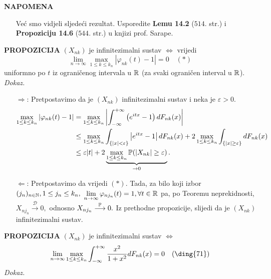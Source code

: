 \documentclass{article}
\begin{document}
\textbf{NAPOMENA}
\begin{enumerate}
    \item[\ding{113}] Već smo vidjeli sljedeći rezultat. Usporedite \textbf{Lemu 14.2} (\(514.\) str.) i  \textbf{Propoziciju 14.6} (\(544.\) str.) u knjizi prof. Sarape. 
\end{enumerate}
\textbf{PROPOZICIJA}\newline
\((X_{nk})\) je infinitezimalni sustav \(\Leftrightarrow\) vrijedi \[\lim_{n\to\infty}\max_{1\le k\le k_n}|\varphi_{nk}(t)-1|=0\quad(\ast)\] uniformno po \(t\) iz ograničenog intervala u \(\Bbb R\) (za svaki ograničen interval u \(\Bbb R\)).\newline\newline
\textit{Dokaz.}
\begin{enumerate}
    \item[\(\boxed{\Rightarrow}\):] Pretpostavimo da je \((X_{nk})\) infinitezimalni sustav i neka je \(\varepsilon>0.\) \[\begin{aligned}\max_{1\le k\le k_n}|\varphi_{nk}(t)-1|&=\max_{1\le k\le k_n}\left|\int_{-\infty}^{+\infty}\left(e^{itx}-1\right)dF_{nk}(x)\right|\\&\le\max_{1\le k\le k_n}\int_{\{|x|<\varepsilon\}}\left|e^{itx}-1\right|dF_{nk}(x)+2\max_{1\le k\le k_n}\int_{\{|x|\ge\varepsilon\}}dF_{nk}(x)\\&\le\varepsilon|t|+2\underbrace{\max_{1\le k\le k_n}\Bbb P(|X_{nk}|\ge\varepsilon)}_{\to0}.\end{aligned}\]
    \item[\(\boxed{\Leftarrow}\):] Pretpostavimo da vrijedi \((\ast).\) Tada, za bilo koji izbor \((j_n)_{n\in\Bbb N},1\le j_n\le k_n,\) \(\lim\limits_{n\to\infty}\varphi_{nj_n}(t)=1,\forall t\in\Bbb R\) pa, po Teoremu neprekidnosti, \(X_{nj_n}\overset{\mathcal D}{\longrightarrow}0,\) odnosno \(X_{nj_n}\overset{\Bbb P}{\longrightarrow}0.\) Iz prethodne propozicije, slijedi da je \((X_{nk})\) infinitezimalni sustav.
\end{enumerate}
\textbf{PROPOZICIJA}\newline
\((X_{nk})\) je infinitezimalni sustav \(\Leftrightarrow\) \[\lim_{n\to\infty}\max_{1\le k\le k_n}\int_{-\infty}^{+\infty}\frac{x^2}{1+x^2}dF_{nk}(x)=0\quad(\text{\ding{71}})\]
\textit{Dokaz.}
\end{document}
